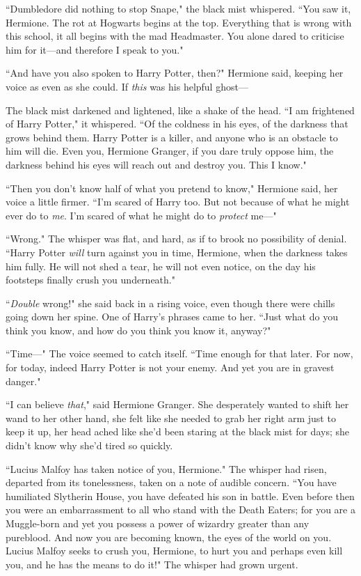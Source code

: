 ``Dumbledore did nothing to stop Snape," the black mist whispered. ``You saw it, Hermione. The rot at Hogwarts begins at the top. Everything that is wrong with this school, it all begins with the mad Headmaster. You alone dared to criticise him for it---and therefore I speak to you."

``And have you also spoken to Harry Potter, then?" Hermione said, keeping her voice as even as she could. If \emph{this} was his helpful ghost---

The black mist darkened and lightened, like a shake of the head. ``I am frightened of Harry Potter," it whispered. ``Of the coldness in his eyes, of the darkness that grows behind them. Harry Potter is a killer, and anyone who is an obstacle to him will die. Even you, Hermione Granger, if you dare truly oppose him, the darkness behind his eyes will reach out and destroy you. This I know."

``Then you don't know half of what you pretend to know," Hermione said, her voice a little firmer. ``I'm scared of Harry too. But not because of what he might ever do to \emph{me}. I'm scared of what he might do to \emph{protect} me---"

``Wrong." The whisper was flat, and hard, as if to brook no possibility of denial. ``Harry Potter \emph{will} turn against you in time, Hermione, when the darkness takes him fully. He will not shed a tear, he will not even notice, on the day his footsteps finally crush you underneath."

``\emph{Double} wrong!" she said back in a rising voice, even though there were chills going down her spine. One of Harry's phrases came to her. ``Just what do you think you know, and how do you think you know it, anyway?"

``Time---" The voice seemed to catch itself. ``Time enough for that later. For now, for today, indeed Harry Potter is not your enemy. And yet you are in gravest danger."

``I can believe \emph{that}," said Hermione Granger. She desperately wanted to shift her wand to her other hand, she felt like she needed to grab her right arm just to keep it up, her head ached like she'd been staring at the black mist for days; she didn't know why she'd tired so quickly.

``Lucius Malfoy has taken notice of you, Hermione." The whisper had risen, departed from its tonelessness, taken on a note of audible concern. ``You have humiliated Slytherin House, you have defeated his son in battle. Even before then you were an embarrassment to all who stand with the Death Eaters; for you are a Muggle-born and yet you possess a power of wizardry greater than any pureblood. And now you are becoming known, the eyes of the world on you. Lucius Malfoy seeks to crush you, Hermione, to hurt you and perhaps even kill you, and he has the means to do it!" The whisper had grown urgent.

